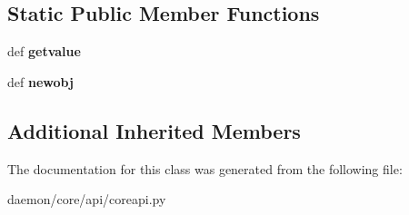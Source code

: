 \subsection*{Static Public Member Functions}
\begin{DoxyCompactItemize}
\item 
\hypertarget{classcore_1_1api_1_1coreapi_1_1_core_tlv_data_obj_a4fac28266dac0fe795d84eb3491e6a54}{def {\bfseries getvalue}}\label{classcore_1_1api_1_1coreapi_1_1_core_tlv_data_obj_a4fac28266dac0fe795d84eb3491e6a54}

\item 
\hypertarget{classcore_1_1api_1_1coreapi_1_1_core_tlv_data_obj_ae0f2f027c3239e81e99e0f5c4914a981}{def {\bfseries newobj}}\label{classcore_1_1api_1_1coreapi_1_1_core_tlv_data_obj_ae0f2f027c3239e81e99e0f5c4914a981}

\end{DoxyCompactItemize}
\subsection*{Additional Inherited Members}


The documentation for this class was generated from the following file\+:\begin{DoxyCompactItemize}
\item 
daemon/core/api/coreapi.\+py\end{DoxyCompactItemize}
